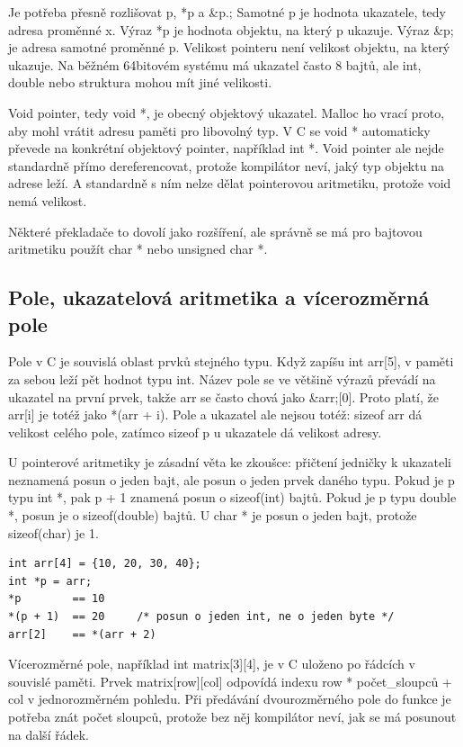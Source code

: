 \documentclass[11pt,a4paper]{article}
\begin{document}
Je potřeba přesně rozlišovat p, *p a \&p.; Samotné p je hodnota ukazatele, tedy adresa proměnné x. Výraz *p je hodnota objektu, na který p ukazuje. Výraz \&p; je adresa samotné proměnné p. Velikost pointeru není velikost objektu, na který ukazuje. Na běžném 64bitovém systému má ukazatel často 8 bajtů, ale int, double nebo struktura mohou mít jiné velikosti.

Void pointer, tedy void *, je obecný objektový ukazatel. Malloc ho vrací proto, aby mohl vrátit adresu paměti pro libovolný typ. V C se void * automaticky převede na konkrétní objektový pointer, například int *. Void pointer ale nejde standardně přímo dereferencovat, protože kompilátor neví, jaký typ objektu na adrese leží. A standardně s ním nelze dělat pointerovou aritmetiku, protože void nemá velikost.

Některé překladače to dovolí jako rozšíření, ale správně se má pro bajtovou aritmetiku použít char * nebo unsigned char *.

\subsection*{Pole, ukazatelová aritmetika a vícerozměrná pole}

Pole v C je souvislá oblast prvků stejného typu. Když zapíšu int arr[5], v paměti za sebou leží pět hodnot typu int. Název pole se ve většině výrazů převádí na ukazatel na první prvek, takže arr se často chová jako \&arr;[0]. Proto platí, že arr[i] je totéž jako *(arr + i). Pole a ukazatel ale nejsou totéž: sizeof arr dá velikost celého pole, zatímco sizeof p u ukazatele dá velikost adresy.

U pointerové aritmetiky je zásadní věta ke zkoušce: přičtení jedničky k ukazateli neznamená posun o jeden bajt, ale posun o jeden prvek daného typu. Pokud je p typu int *, pak p + 1 znamená posun o sizeof(int) bajtů. Pokud je p typu double *, posun je o sizeof(double) bajtů. U char * je posun o jeden bajt, protože sizeof(char) je 1.

\begin{codebox}
\small
\begin{verbatim}
int arr[4] = {10, 20, 30, 40};
int *p = arr;
*p        == 10
*(p + 1)  == 20     /* posun o jeden int, ne o jeden byte */
arr[2]    == *(arr + 2)
\end{verbatim}
\end{codebox}

Vícerozměrné pole, například int matrix[3][4], je v C uloženo po řádcích v souvislé paměti. Prvek matrix[row][col] odpovídá indexu row * počet\_sloupců + col v jednorozměrném pohledu. Při předávání dvourozměrného pole do funkce je potřeba znát počet sloupců, protože bez něj kompilátor neví, jak se má posunout na další řádek.
\end{document}

